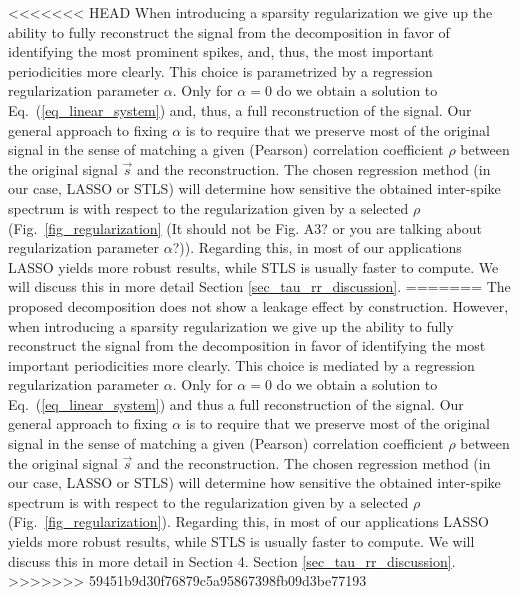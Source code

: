 \documentclass[entropy,article,submit,pdftex,moreauthors]{Definitions/mdpi}
\begin{document}
<<<<<<< HEAD
When introducing a sparsity regularization we give up the ability to fully reconstruct the signal from the decomposition in favor of identifying the most prominent spikes, and, thus, the most important periodicities more clearly. This choice is parametrized by a regression regularization parameter $\alpha$. Only for $\alpha = 0$ do we obtain a solution to Eq.~(\ref{eq_linear_system}) and, thus, a full reconstruction of the signal. Our general approach to fixing $\alpha$ is to require that we preserve most of the original signal in the sense of matching a given (Pearson) correlation coefficient $\rho$ between the original signal $\vec{s}$ and the reconstruction. The chosen regression method (in our case, LASSO or STLS) will determine how sensitive the obtained inter-spike spectrum is with respect to the regularization given by a 
selected $\rho$ (Fig.~\ref{fig_regularization} {\color{red}(It should not be Fig. A3? or you are talking about regularization parameter $\alpha$?)}). Regarding this, in most of our applications LASSO yields more robust results, while STLS is usually faster to compute. 
We will discuss this in more detail Section \ref{sec_tau_rr_discussion}.
=======
The proposed decomposition does not show a leakage effect by construction. However, when introducing a sparsity regularization we give up the ability to fully reconstruct the signal from the decomposition in favor of identifying the most important periodicities more clearly. This choice is mediated by a regression regularization parameter $\alpha$. Only for $\alpha = 0$ do we obtain a solution to Eq.~(\ref{eq_linear_system}) and thus a full reconstruction of the signal. Our general approach to fixing $\alpha$ is to require that we preserve most of the original signal in the sense of matching a given (Pearson) correlation coefficient $\rho$ between the original signal $\vec{s}$ and the reconstruction. The chosen regression method (in our case, LASSO or STLS) will determine how sensitive the obtained inter-spike spectrum is with respect to the regularization given by a 
selected $\rho$ (Fig.~\ref{fig_regularization}). Regarding this, in most of our applications LASSO yields more robust results, while STLS is usually faster to compute. 
We will discuss this in more detail in Section 4. Section \ref{sec_tau_rr_discussion}.
>>>>>>> 59451b9d30f76879c5a95867398fb09d3be77193
\end{document}
